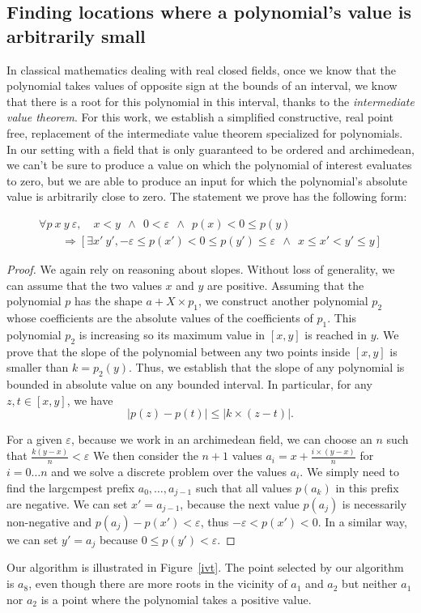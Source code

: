 \documentclass{mscs}
\begin{document}
\subsection{Finding locations where a polynomial's value is
  arbitrarily small}
\label{ssec:civt}
In classical mathematics dealing with real closed
fields, once we know that the
polynomial takes values of opposite sign at the bounds of an interval,
we know that there is a root for this polynomial in this interval,
thanks to the {\em intermediate value theorem}. For this work, we establish
a simplified constructive, real point free, replacement of the intermediate value
theorem specialized for polynomials.  In our setting with a field that is only guaranteed to be ordered and archimedean,
we can't be sure to produce a value on which the
polynomial of interest evaluates to zero, but we are
able to produce an input for which the polynomial's absolute value is
arbitrarily close to zero. The statement we prove has the following
form:
\begin{theorem}
\[
\begin{array}{l}
{\forall p~x~y~\varepsilon,\quad x < y~~\wedge~~0 < \varepsilon~~\wedge~~p(x) < 0 \leq p(y)}\\
\qquad\Rightarrow [\exists x'~ y', -\varepsilon \leq p(x') < 0 \leq p(y') \leq
\varepsilon ~~\wedge~~
x \leq x' < y' \leq y]
\end{array}
\]
\end{theorem}
\begin{proof}
We again rely on reasoning about slopes. Without loss of generality,
we can assume that the two values \(x\) and \(y\) are positive. Assuming
that the polynomial $p$ has the shape \(a + X \times p_1\), we construct
another polynomial \(p_2\) whose coefficients are the absolute values of the
coefficients of \(p_1\).  This polynomial $p_2$ is increasing so its maximum
value in \([x,y]\) is reached in \(y\).   We prove that the slope
of the polynomial between any two points inside \([x,y]\) is smaller than
\(k  = p_2(y)\).  Thus, we establish that the
slope of any polynomial is bounded in absolute value on any bounded
interval.  In particular, for any \(z, t\in [x,y]\), we have
\[|p(z)-p(t)| \leq |k \times (z - t)|.\]

For a given \(\varepsilon\), because we work in an archimedean field, we can
choose an \(n\) such that \(\frac{k(y-x)}{n} < \varepsilon\)
 We then consider the
\(n+1\) values \(a_i = x + \frac{i\times (y-x)}{n}\) for \(i = 0 \dots
n\) and we solve a
discrete problem over the values \(a_i\).  We simply need to find the
largcmpest prefix \(a_0, \ldots, a_{j-1}\) such that all values \(p(a_k)\) in this
prefix are negative.  We can set \(x' =a_{j-1}\), because the next
value \(p(a_j)\) is necessarily non-negative and
\(p(a_j) - p(x') < \varepsilon\), thus \(-\varepsilon < p(x') < 0\).
In a similar way, we can set \(y'= a_j\) because \(0 \leq p(y') < \varepsilon\).
\end{proof}
Our algorithm is illustrated in Figure~\ref{ivt}. The point selected by
our algorithm is \(a_8\), even though there are more roots in the
vicinity of \(a_1\) and \(a_2\) but neither \(a_1\) nor \(a_2\) is a
point where the polynomial takes a positive value.
\end{document}
